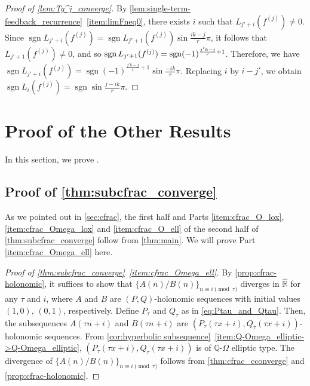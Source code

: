 \documentclass[a4paper,UKenglish,cleveref,autoref,thm-restate]{lipics-v2021}
\newcommand{\R}{\mathbb{R}}
\newcommand{\Q}{\mathbb{Q}}
\DeclareMathOperator{\sgn}{sgn}
\begin{document}
\begin{proof}[Proof of \cref{lem:Tg^j_converge}]
By \cref{lem:single-term-feedback_recurrence}~\eqref{item:limFneq0}, there exists $i$ such that $L_{j' + i} (f^{(j)}) \neq 0$. Since $\sgn L_{j' + i} (f^{(j)}) = \sgn L_{j'+1} (f^{(j)}) \sin \frac{ik-j}r \pi$, it follows that $L_{j'+1} (f^{(j)}) \neq 0$, and so $\sgn L_{j'+1} (f^{(j)}) =  \break \sgn (-1)^{\frac{j'k - j}r + 1}$. Therefore, we have $\sgn L_{j' + i} (f^{(j)}) = \sgn (-1)^{\frac{j'k - j}r + 1} \sin \frac{-ik}r \pi$. Replacing $i$ by $i - j'$, we obtain $\sgn L_{i} (f^{(j)}) = \sgn \sin \frac{j-ik}r \pi$.
\end{proof}






\section{Proof of the Other Results} \label{sec:proofs_of_related_results}

In this section, we prove . 


\subsection{Proof of \cref{thm:subcfrac_converge}} \label{sec:proof_of_cfrac}

As we pointed out in \cref{sec:cfrac}, the first half and Parts \eqref{item:cfrac_O_lox}, \eqref{item:cfrac_Omega_lox} and \eqref{item:cfrac_O_ell} of the second half of \cref{thm:subcfrac_converge} follow from \cref{thm:main}. We will prove Part \eqref{item:cfrac_Omega_ell} here. 

\begin{proof}[Proof of \cref{thm:subcfrac_converge}~\eqref{item:cfrac_Omega_ell}]
By \cref{prop:cfrac-holonomic}, it suffices to show that $\{ A(n) / B(n) \}_{n \equiv i \pmod{\tau}}$ diverges in $\hat{\R}$ for any $\tau$ and $i$, where $A$ and $B$ are $(P, Q)$-holonomic sequences with initial values $(1, 0)$, $(0, 1)$, respectively. 
Define $P_{\tau}$ and $Q_{\tau}$ as in \eqref{eq:Ptau_and_Qtau}. Then, the subsequences $A(\tau n + i)$ and $B(\tau n + i)$ are $(P_{\tau}(\tau x+i), Q_{\tau}(\tau x+i))$-holonomic sequences. 
From \cref{cor:hyperbolic subsequence}~\eqref{item:Q-Omega_elliptic->Q-Omega_elliptic},
$(P_{\tau}(\tau x+i), Q_{\tau}(\tau x+i))$ is of $\Q$-$\Omega$ elliptic type. 
The divergence of $\{ A(n) / B(n) \}_{n \equiv i \pmod{\tau}}$ follows from \cref{thm:cfrac_cconverge} and \cref{prop:cfrac-holonomic}. 
\end{proof}
\end{document}
